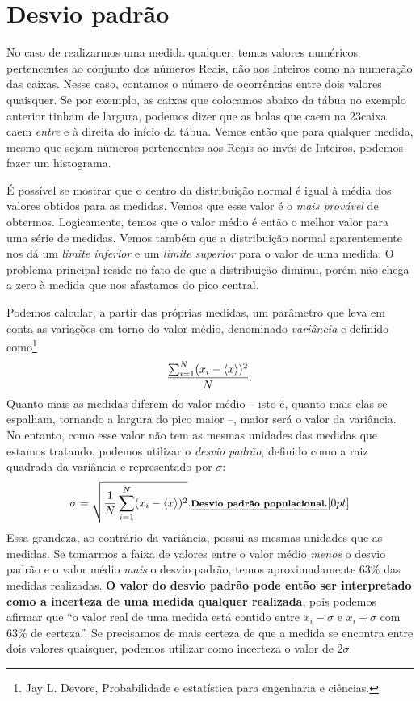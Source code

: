\section{Desvio padrão}

No caso de realizarmos uma medida qualquer, temos valores numéricos pertencentes ao conjunto dos números Reais, não aos Inteiros como na numeração das caixas. Nesse caso, contamos o número de ocorrências entre dois valores quaisquer. Se por exemplo, as caixas que colocamos abaixo da tábua no exemplo anterior tinham  de largura, podemos dizer que as bolas que caem na 23\textordfeminine caixa caem \emph{entre}  e  à direita do início da tábua. Vemos então que para qualquer medida, mesmo que sejam números pertencentes aos Reais ao invés de Inteiros, podemos fazer um histograma.

É possível se mostrar\cite{Taylor} que o centro da distribuição normal é igual à média dos valores obtidos para as medidas. Vemos que esse valor é o \emph{mais provável} de obtermos. Logicamente, temos que o valor médio é então o melhor valor para uma série de medidas. Vemos também que a distribuição normal aparentemente nos dá um \emph{limite inferior} e um \emph{limite superior} para o valor de uma medida. O problema principal reside no fato de que a distribuição diminui, porém não chega a zero à medida que nos afastamos do pico central. 

Podemos calcular, a partir das próprias medidas, um parâmetro que leva em conta as variações em torno do valor médio, denominado \emph{variância} e definido como\footnote{Jay L. Devore, Probabilidade e estatística para engenharia e ciências.}
\begin{equation}
	\frac{\sum_{i=1}^{N} (x_i - \left\langle{x}\right\rangle)^2}{N}.
\end{equation}
%
Quanto mais as medidas diferem do valor médio -- isto é, quanto mais elas se espalham, tornando a largura do pico maior --, maior será o valor da variância. No entanto, como esse valor não tem as mesmas unidades das medidas que estamos tratando, podemos utilizar o \emph{desvio padrão}, definido como a raiz quadrada da variância e representado por $\sigma$:
\begin{equation}\label{Eq:DesvioPadraoN}
	\sigma = \sqrt{\frac{1}{N} \sum_{i=1}^N (x_i - \left\langle{x}\right\rangle)^2}. \relax{\footnotesize\emph{\textbf{Desvio padrão populacional.}}}[0pt]
\end{equation}
%
Essa grandeza, ao contrário da variância, possui as mesmas unidades que as medidas. Se tomarmos a faixa de valores entre o valor médio \emph{menos} o desvio padrão e o valor médio \emph{mais} o desvio padrão, temos aproximadamente 63\% das medidas realizadas. \textbf{O valor do desvio padrão pode então ser interpretado como a incerteza de uma medida qualquer realizada}, pois podemos afirmar que ``o valor real de uma medida está contido entre $x_i - \sigma$ e $x_i + \sigma$ com 63\% de certeza''. Se precisamos de mais certeza de que a medida se encontra entre dois valores quaisquer, podemos utilizar como incerteza o valor de $2\sigma$.

